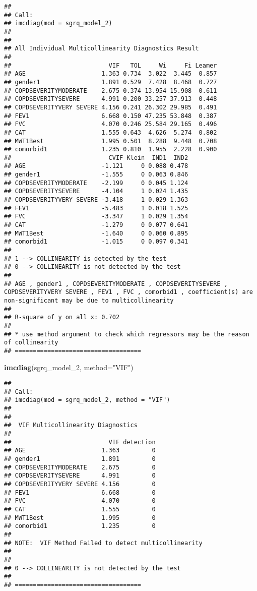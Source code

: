 \documentclass[
]{article}
\newenvironment{Shaded}{\begin{snugshade}}{\end{snugshade}}
\newcommand{\AttributeTok}[1]{\textcolor[rgb]{0.13,0.29,0.53}{#1}}
\newcommand{\FunctionTok}[1]{\textcolor[rgb]{0.13,0.29,0.53}{\textbf{#1}}}
\newcommand{\NormalTok}[1]{#1}
\newcommand{\StringTok}[1]{\textcolor[rgb]{0.31,0.60,0.02}{#1}}
\begin{document}
\begin{verbatim}
## 
## Call:
## imcdiag(mod = sgrq_model_2)
## 
## 
## All Individual Multicollinearity Diagnostics Result
## 
##                           VIF   TOL     Wi     Fi Leamer
## AGE                     1.363 0.734  3.022  3.445  0.857
## gender1                 1.891 0.529  7.428  8.468  0.727
## COPDSEVERITYMODERATE    2.675 0.374 13.954 15.908  0.611
## COPDSEVERITYSEVERE      4.991 0.200 33.257 37.913  0.448
## COPDSEVERITYVERY SEVERE 4.156 0.241 26.302 29.985  0.491
## FEV1                    6.668 0.150 47.235 53.848  0.387
## FVC                     4.070 0.246 25.584 29.165  0.496
## CAT                     1.555 0.643  4.626  5.274  0.802
## MWT1Best                1.995 0.501  8.288  9.448  0.708
## comorbid1               1.235 0.810  1.955  2.228  0.900
##                           CVIF Klein  IND1  IND2
## AGE                     -1.121     0 0.088 0.478
## gender1                 -1.555     0 0.063 0.846
## COPDSEVERITYMODERATE    -2.199     0 0.045 1.124
## COPDSEVERITYSEVERE      -4.104     1 0.024 1.435
## COPDSEVERITYVERY SEVERE -3.418     1 0.029 1.363
## FEV1                    -5.483     1 0.018 1.525
## FVC                     -3.347     1 0.029 1.354
## CAT                     -1.279     0 0.077 0.641
## MWT1Best                -1.640     0 0.060 0.895
## comorbid1               -1.015     0 0.097 0.341
## 
## 1 --> COLLINEARITY is detected by the test 
## 0 --> COLLINEARITY is not detected by the test
## 
## AGE , gender1 , COPDSEVERITYMODERATE , COPDSEVERITYSEVERE , COPDSEVERITYVERY SEVERE , FEV1 , FVC , comorbid1 , coefficient(s) are non-significant may be due to multicollinearity
## 
## R-square of y on all x: 0.702 
## 
## * use method argument to check which regressors may be the reason of collinearity
## ===================================
\end{verbatim}

\begin{Shaded}
\begin{Highlighting}[]
\FunctionTok{imcdiag}\NormalTok{(sgrq\_model\_2, }\AttributeTok{method=}\StringTok{"VIF"}\NormalTok{)}
\end{Highlighting}
\end{Shaded}

\begin{verbatim}
## 
## Call:
## imcdiag(mod = sgrq_model_2, method = "VIF")
## 
## 
##  VIF Multicollinearity Diagnostics
## 
##                           VIF detection
## AGE                     1.363         0
## gender1                 1.891         0
## COPDSEVERITYMODERATE    2.675         0
## COPDSEVERITYSEVERE      4.991         0
## COPDSEVERITYVERY SEVERE 4.156         0
## FEV1                    6.668         0
## FVC                     4.070         0
## CAT                     1.555         0
## MWT1Best                1.995         0
## comorbid1               1.235         0
## 
## NOTE:  VIF Method Failed to detect multicollinearity
## 
## 
## 0 --> COLLINEARITY is not detected by the test
## 
## ===================================
\end{verbatim}
\end{document}
